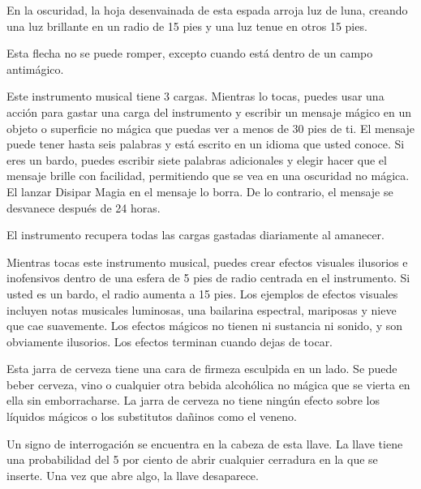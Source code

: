 \documentclass[a4paper,twocolumn,openany,10pt]{dndbook}
\begin{document}
En la oscuridad, la hoja desenvainada de esta espada arroja luz de luna, creando una luz brillante en un radio de 15 pies y una
luz tenue en otros 15 pies. 

Esta flecha no se puede romper, excepto cuando está dentro de un campo antimágico.

Este instrumento musical tiene 3 cargas. Mientras lo tocas, puedes usar una acción para gastar una carga del instrumento y
escribir un mensaje mágico en un objeto o superficie no mágica que puedas ver a menos de 30 pies de ti. El mensaje puede tener
hasta seis palabras y está escrito en un idioma que usted conoce. Si eres un bardo, puedes escribir siete palabras adicionales y
elegir hacer que el mensaje brille con facilidad, permitiendo que se vea en una oscuridad no mágica. El lanzar Disipar Magia en
el mensaje lo borra. De lo contrario, el mensaje se desvanece después de 24 horas.

El instrumento recupera todas las cargas gastadas diariamente al amanecer. 

Mientras tocas este instrumento musical, puedes crear efectos visuales ilusorios e inofensivos dentro de una esfera de 5 pies de
radio centrada en el instrumento. Si usted es un bardo, el radio aumenta a 15 pies. Los ejemplos de efectos visuales incluyen
notas musicales luminosas, una bailarina espectral, mariposas y nieve que cae suavemente. Los efectos mágicos no tienen ni
sustancia ni sonido, y son obviamente ilusorios. Los efectos terminan cuando dejas de tocar. 

Esta jarra de cerveza tiene una cara de firmeza esculpida en un lado. Se puede beber cerveza, vino o cualquier otra bebida
alcohólica no mágica que se vierta en ella sin emborracharse. La jarra de cerveza no tiene ningún efecto sobre los líquidos
mágicos o los substitutos dañinos como el veneno.

Un signo de interrogación se encuentra en la cabeza de esta llave. La llave tiene una probabilidad del 5 por ciento de abrir
cualquier cerradura en la que se inserte. Una vez que abre algo, la llave desaparece. 
\end{document}
